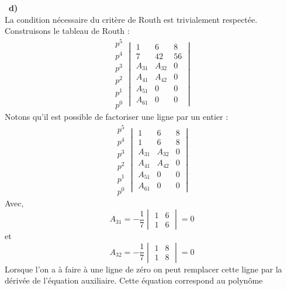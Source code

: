 \noindent~\textbf{d)}\\
La condition nécessaire du critère de Routh est trivialement respectée.
Construisons le tableau de Routh :
\[
\begin{matrix}
    p^5 \\[1em]
    p^4 \\[1em]
    \hline
    p^3 \\[1em]
    p^2 \\[1em]
    p^1 \\[1em]
    p^0 
\end{matrix}
\begin{vmatrix}
    1  & 6   & 8 \\[1em]
    7  & 42  & 56 \\[1em] 
    \hline
    A_{31} & A_{32} & 0\\[1em]
    A_{41} & A_{42} & 0\\[1em]
    A_{51} & 0      & 0\\[1em]
    A_{61} & 0 & 0
\end{vmatrix}
\]
Notons qu'il est possible de factoriser une ligne par un entier :
\[
\begin{matrix}
    p^5 \\[1em]
    p^4 \\[1em]
    \hline
    p^3 \\[1em]
    p^2 \\[1em]
    p^1 \\[1em]
    p^0 
\end{matrix}
\begin{vmatrix}
    1  & 6   & 8 \\[1em]
    1  & 6   & 8 \\[1em] 
    \hline
    A_{31} & A_{32} & 0\\[1em]
    A_{41} & A_{42} & 0\\[1em]
    A_{51} & 0      & 0\\[1em]
    A_{61} & 0 & 0
\end{vmatrix}
\]
Avec,
\[
A_{31}=-\dfrac{1}{7}\begin{vmatrix}1 & 6 \\ 1& 6\end{vmatrix} = 0
\]
et 
\[
A_{32}=-\dfrac{1}{7}\begin{vmatrix}1 & 8 \\ 1& 8\end{vmatrix} = 0
\]
Lorsque l'on a à faire à une ligne de zéro on peut remplacer cette ligne 
par la dérivée de l'équation auxiliaire. Cette équation correspond au polynôme 

